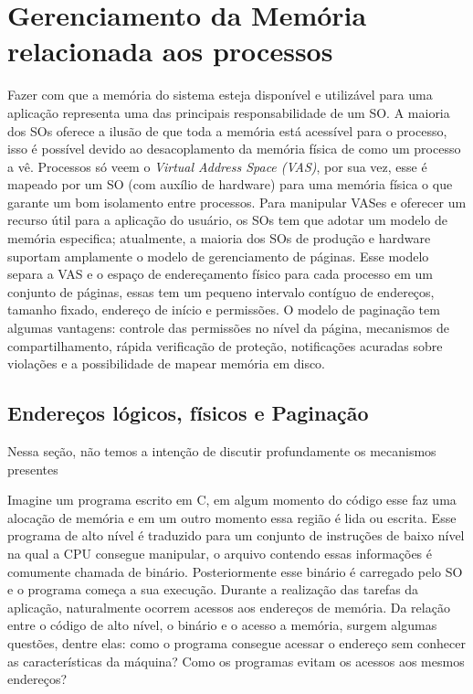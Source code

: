 \section{Gerenciamento da Memória relacionada aos processos}

Fazer com que a memória do sistema esteja disponível e utilizável para uma
aplicação representa uma das principais responsabilidade de um SO. A maioria
dos SOs oferece a ilusão de que toda a memória está acessível para o processo,
isso é possível devido ao desacoplamento da memória física de como um processo
a vê. Processos só veem o \emph{Virtual Address Space (VAS)}, por sua vez, esse
é mapeado por um SO (com auxílio de hardware) para uma memória física o que
garante um bom isolamento entre processos. Para manipular VASes e oferecer um
recurso útil para a aplicação do usuário, os SOs tem que adotar um modelo de
memória especifica; atualmente, a maioria dos SOs de produção e hardware
suportam amplamente o modelo de gerenciamento de páginas.  Esse modelo separa a
VAS e o espaço de endereçamento físico para cada processo em um conjunto de
páginas, essas tem um pequeno intervalo contíguo de endereços, tamanho fixado,
endereço de início e permissões. O modelo de paginação tem algumas vantagens:
controle das permissões no nível da página, mecanismos de compartilhamento,
rápida verificação de proteção, notificações acuradas sobre violações e a
possibilidade de mapear memória em disco.

\subsection{Endereços lógicos, físicos e Paginação}

Nessa seção, não temos a intenção de discutir profundamente os mecanismos presentes 

Imagine um programa escrito em C, em algum momento do código esse faz uma
alocação de memória e em um outro momento essa região é lida ou escrita. Esse
programa de alto nível é traduzido para um conjunto de instruções de baixo
nível na qual a CPU consegue manipular, o arquivo contendo essas informações é
comumente chamada de binário.  Posteriormente esse binário é carregado pelo SO
e o programa começa a sua execução. Durante a realização das tarefas da
aplicação, naturalmente ocorrem acessos aos endereços de memória. Da relação
entre o código de alto nível, o binário e o acesso a memória, surgem algumas
questões, dentre elas: como o programa consegue acessar o endereço sem conhecer
as características da máquina? Como os programas evitam os acessos aos mesmos
endereços?

